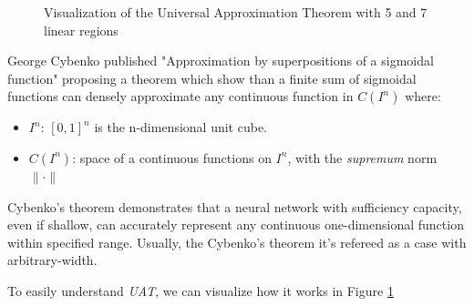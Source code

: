 \documentclass{tufte-handout}
\begin{document}
\begin{figure}[h]
\caption{Visualization of the Universal Approximation Theorem with 5 and 7 linear regions}
\label{fig:UAT}
\end{figure}

George Cybenko published "Approximation by superpositions of a sigmoidal function" proposing a theorem which show than a finite sum of sigmoidal functions can densely approximate any continuous function in $C(I^n)$ where:
\begin{itemize}
    \item $I^n$: $[0,1]^n$ is the n-dimensional unit cube.
    \item $C(I^n)$: space of a continuous functions on $I^n$, with the \textit{supremum} norm $\| \cdot \|$
\end{itemize}

Cybenko's theorem demonstrates that a neural network with sufficiency capacity, even if shallow, can accurately represent any continuous one-dimensional function within specified range. Usually, the Cybenko's theorem it's refereed as a case with arbitrary-width.

To easily understand \textit{UAT}, we can visualize how it works in Figure \ref{fig:UAT}
\end{document}
